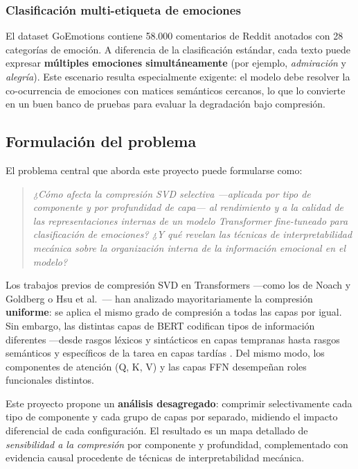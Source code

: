 \documentclass[11pt, a4paper]{article}
\begin{document}
\subsubsection{Clasificación multi-etiqueta de emociones}

El dataset GoEmotions \cite{demszky2020goemotions} contiene 58.000 comentarios de Reddit anotados con 28 categorías de emoción. A diferencia de la clasificación estándar, cada texto puede expresar \textbf{múltiples emociones simultáneamente} (por ejemplo, \textit{admiración} y \textit{alegría}). Este escenario resulta especialmente exigente: el modelo debe resolver la co-ocurrencia de emociones con matices semánticos cercanos, lo que lo convierte en un buen banco de pruebas para evaluar la degradación bajo compresión.

\subsection{Formulación del problema}
\label{sec:problema}

El problema central que aborda este proyecto puede formularse como:

\begin{quote}
    \textit{¿Cómo afecta la compresión SVD selectiva ---aplicada por tipo de componente y por profundidad de capa--- al rendimiento y a la calidad de las representaciones internas de un modelo Transformer fine-tuneado para clasificación de emociones? ¿Y qué revelan las técnicas de interpretabilidad mecánica sobre la organización interna de la información emocional en el modelo?}
\end{quote}

Los trabajos previos de compresión SVD en Transformers ---como los de Noach y Goldberg \cite{noach2020compressing} o Hsu et al.\ \cite{hsu2022language}--- han analizado mayoritariamente la compresión \textbf{uniforme}: se aplica el mismo grado de compresión a todas las capas por igual. Sin embargo, las distintas capas de BERT codifican tipos de información diferentes ---desde rasgos léxicos y sintácticos en capas tempranas hasta rasgos semánticos y específicos de la tarea en capas tardías \cite{tenney2019bert, jawahar2019what}. Del mismo modo, los componentes de atención (Q, K, V) y las capas FFN desempeñan roles funcionales distintos.

Este proyecto propone un \textbf{análisis desagregado}: comprimir selectivamente cada tipo de componente y cada grupo de capas por separado, midiendo el impacto diferencial de cada configuración. El resultado es un mapa detallado de \textit{sensibilidad a la compresión} por componente y profundidad, complementado con evidencia causal procedente de técnicas de interpretabilidad mecánica.
\end{document}
